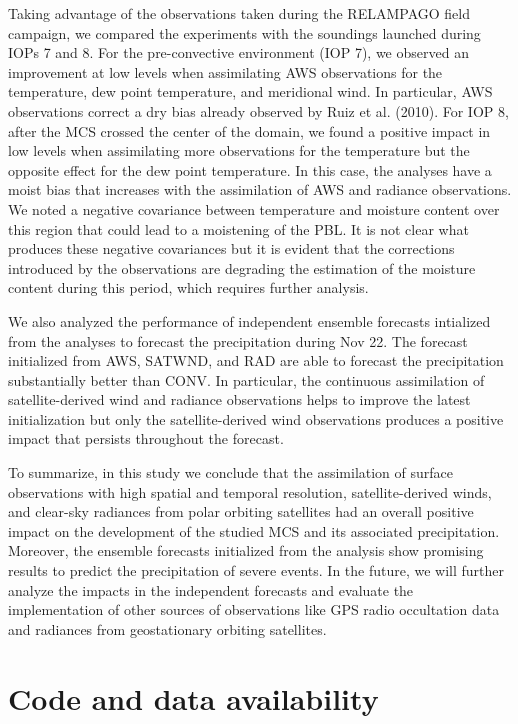 \documentclass[authoryear,preprint,review,12pt]{elsarticle} %
\begin{document}
Taking advantage of the observations taken during the RELAMPAGO field campaign, we compared the experiments with the soundings launched during IOPs 7 and 8. For the pre-convective environment (IOP 7), we observed an improvement at low levels when assimilating AWS observations for the temperature, dew point temperature, and meridional wind. In particular, AWS observations correct a dry bias already observed by Ruiz et al. (2010). For IOP 8, after the MCS crossed the center of the domain, we found a positive impact in low levels when assimilating more observations for the temperature but the opposite effect for the dew point temperature. In this case, the analyses have a moist bias that increases with the assimilation of AWS and radiance observations. We noted a negative covariance between temperature and moisture content over this region that could lead to a moistening of the PBL. It is not clear what produces these negative covariances but it is evident that the corrections introduced by the observations are degrading the estimation of the moisture content during this period, which requires further analysis.

We also analyzed the performance of independent ensemble forecasts intialized from the analyses to forecast the precipitation during Nov 22. The forecast initialized from AWS, SATWND, and RAD are able to forecast the precipitation substantially better than CONV. In particular, the continuous assimilation of satellite-derived wind and radiance observations helps to improve the latest initialization but only the satellite-derived wind observations produces a positive impact that persists throughout the forecast.

To summarize, in this study we conclude that the assimilation of surface observations with high spatial and temporal resolution, satellite-derived winds, and clear-sky radiances from polar orbiting satellites had an overall positive impact on the development of the studied MCS and its associated precipitation. Moreover, the ensemble forecasts initialized from the analysis show promising results to predict the precipitation of severe events. In the future, we will further analyze the impacts in the independent forecasts and evaluate the implementation of other sources of observations like GPS radio occultation data and radiances from geostationary orbiting satellites.

\hypertarget{code-and-data-availability}{%
\section{Code and data availability}\label{code-and-data-availability}}
\end{document}
